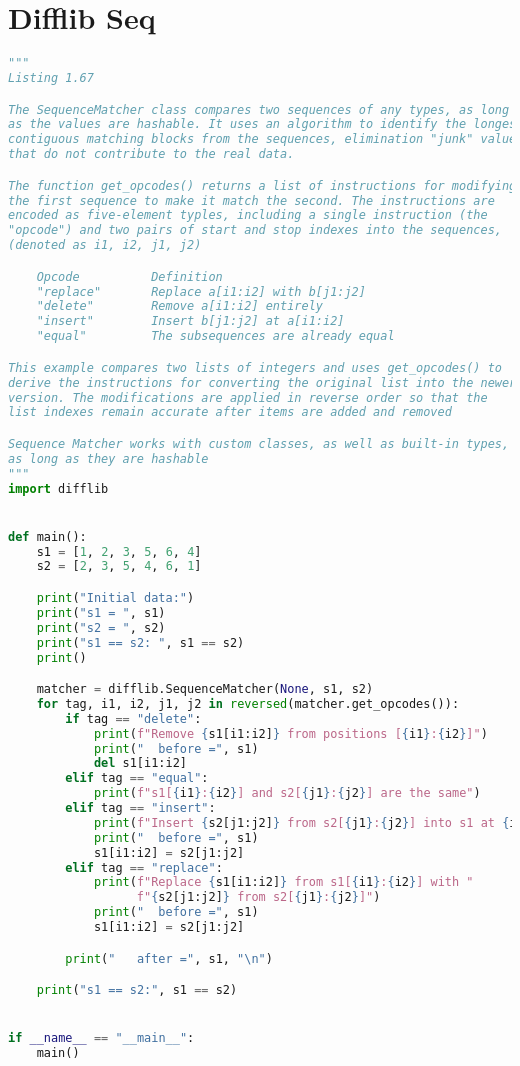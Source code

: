 \documentclass[a4paper,landscape]{report}
\begin{document}
\section{Difflib Seq}
\begin{lstlisting}[language=Python]
"""
Listing 1.67

The SequenceMatcher class compares two sequences of any types, as long
as the values are hashable. It uses an algorithm to identify the longest
contiguous matching blocks from the sequences, elimination "junk" values
that do not contribute to the real data.

The function get_opcodes() returns a list of instructions for modifying
the first sequence to make it match the second. The instructions are
encoded as five-element typles, including a single instruction (the
"opcode") and two pairs of start and stop indexes into the sequences,
(denoted as i1, i2, j1, j2)

    Opcode          Definition
    "replace"       Replace a[i1:i2] with b[j1:j2]
    "delete"        Remove a[i1:i2] entirely
    "insert"        Insert b[j1:j2] at a[i1:i2]
    "equal"         The subsequences are already equal

This example compares two lists of integers and uses get_opcodes() to
derive the instructions for converting the original list into the newer
version. The modifications are applied in reverse order so that the
list indexes remain accurate after items are added and removed

Sequence Matcher works with custom classes, as well as built-in types,
as long as they are hashable
"""
import difflib


def main():
    s1 = [1, 2, 3, 5, 6, 4]
    s2 = [2, 3, 5, 4, 6, 1]

    print("Initial data:")
    print("s1 = ", s1)
    print("s2 = ", s2)
    print("s1 == s2: ", s1 == s2)
    print()

    matcher = difflib.SequenceMatcher(None, s1, s2)
    for tag, i1, i2, j1, j2 in reversed(matcher.get_opcodes()):
        if tag == "delete":
            print(f"Remove {s1[i1:i2]} from positions [{i1}:{i2}]")
            print("  before =", s1)
            del s1[i1:i2]
        elif tag == "equal":
            print(f"s1[{i1}:{i2}] and s2[{j1}:{j2}] are the same")
        elif tag == "insert":
            print(f"Insert {s2[j1:j2]} from s2[{j1}:{j2}] into s1 at {i1}")
            print("  before =", s1)
            s1[i1:i2] = s2[j1:j2]
        elif tag == "replace":
            print(f"Replace {s1[i1:i2]} from s1[{i1}:{i2}] with "
                  f"{s2[j1:j2]} from s2[{j1}:{j2}]")
            print("  before =", s1)
            s1[i1:i2] = s2[j1:j2]

        print("   after =", s1, "\n")

    print("s1 == s2:", s1 == s2)


if __name__ == "__main__":
    main()

\end{lstlisting}
\end{document}
